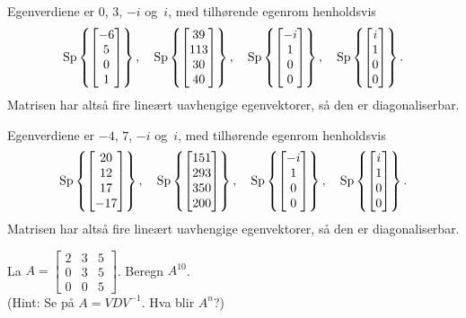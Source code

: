 \begin{losning}
\begin{punkt}
Egenverdiene er $0$, $3$, $-i$ og~$i$, med tilhørende egenrom
henholdsvis
\[
\operatorname{Sp} \left\{ \begin{bmatrix} -6 \\ 5 \\ 0 \\ 1 \end{bmatrix} \right\},\quad
\operatorname{Sp} \left\{ \begin{bmatrix} 39 \\ 113 \\ 30 \\ 40 \end{bmatrix} \right\},\quad
\operatorname{Sp} \left\{ \begin{bmatrix} -i \\ 1 \\ 0 \\ 0 \end{bmatrix} \right\},\quad
\operatorname{Sp} \left\{ \begin{bmatrix} i \\ 1 \\ 0 \\ 0 \end{bmatrix} \right\}.
\]
Matrisen har altså fire lineært uavhengige egenvektorer, så den er
diagonaliserbar.
\end{punkt}

\begin{punkt}
Egenverdiene er $-4$, $7$, $-i$ og~$i$, med tilhørende egenrom
henholdsvis
\[
\operatorname{Sp} \left\{ \begin{bmatrix} 20 \\ 12 \\ 17 \\ -17 \end{bmatrix} \right\},\quad
\operatorname{Sp} \left\{ \begin{bmatrix} 151 \\ 293 \\ 350 \\ 200 \end{bmatrix} \right\},\quad
\operatorname{Sp} \left\{ \begin{bmatrix} -i \\ 1 \\ 0 \\ 0 \end{bmatrix} \right\},\quad
\operatorname{Sp} \left\{ \begin{bmatrix} i \\ 1 \\ 0 \\ 0 \end{bmatrix} \right\}.
\]
Matrisen har altså fire lineært uavhengige egenvektorer, så den er
diagonaliserbar.
\end{punkt}
\end{losning}


\begin{oppgave}
La
$A=\begin{bmatrix}
2 & 3 & 5\\
0 & 3 & 5\\
0 & 0 & 5
\end{bmatrix}$. Beregn $A^{10}$. \\[5pt] (Hint: Se på $A=VDV^{-1}$. 
Hva blir $A^n$?)
\end{oppgave}


